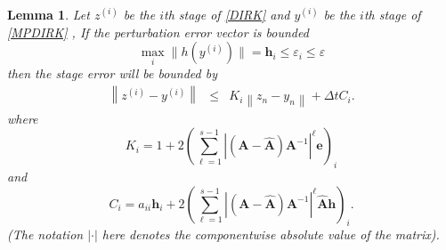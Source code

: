 \documentclass{siamart251104}
\newtheorem{lem}{Lemma}
\newcommand{\dt}{\Delta t}
\newcommand{\m}[1]{\mathbf{#1}}
\newcommand{\ve}{\m{e}}
\newcommand{\vh}{\m{h}}
\newcommand{\mA}{\m{A}}
\newcommand{\mAh}{\m{\hat{A}}}
\begin{document}
\begin{lem} \label{lem2}
Let  $z^{(i)}$ be the $i$th stage of 
\eqref{DIRK} and $y^{(i)}$ be the $i$th stage of  \eqref{MPDIRK} , 
If the perturbation error vector is bounded 
\[ \max_i \| h(y^{(i)}) \| = \vh_i \leq \varepsilon_i \leq \varepsilon \] 
then the  stage error will be bounded by
\begin{eqnarray} \label{StageErrorBound}
\left \| z^{(i)} - y^{(i)}\right\| 
& \leq & K_i \left\|z_n - y_n\right\| +
 \dt C_i  .
\end{eqnarray}
where 
\[  K_i  =  1 + 2 \left( \sum_{\ell =1}^{s-1} 
\left| (\mA- \mAh) \mA^{-1} \right|^\ell
\ve \right)_i \]
and
\[ C_i  =   a_{ii} \vh_i 
+  2 \left( \sum_{\ell =1}^{s-1} \left| (\mA- \mAh) \mA^{-1} \right|^\ell \mAh \vh \right)_i .\]
(The notation $|\cdot|$ here denotes the componentwise absolute value of
the matrix).
\end{lem}
\end{document}
